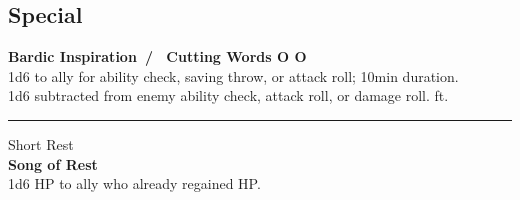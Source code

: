 \documentclass[letterpaper,10pt,twoside,twocolumn,openany]{book}
\begin{document}
\subsection{Special}
\textbf{Bardic Inspiration\ / \ Cutting Words O O}\\
\textbullet 1d6 to ally for {\sc ability check}, {\sc saving throw}, or {\sc attack roll}; 10min duration.\\
\textbullet 1d6 subtracted from enemy {\sc ability check}, {\sc attack roll}, or {\sc damage roll}. { ft.}\\
\rule{1.22in}{0pt}Short Rest\\
\textbf{Song of Rest}\\
1d6 HP to ally who already regained HP.\\
\end{document}
